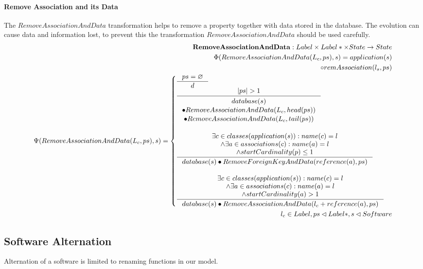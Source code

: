 \documentclass[11pt]{article}
\begin{document}
\paragraph{Remove Association and its Data} The $RemoveAssociationAndData$ transformation helps to remove a property together with data stored in the database. The evolution can cause data and information lost, to prevent this the transformation $RemoveAssociationAndData $ should be used carefully.
\begin{align*}
	\mathbf{RemoveAssociationAndData} : Label \times Label* \times State \rightarrow State \\
	\Phi(RemoveAssociationAndData(L_c, ps), s) = application(s)\\ \circ remAssociation(l_s, ps) \\
	\Psi(RemoveAssociationAndData(L_c, ps), s) = \begin{cases}
		\inference{ps = \varnothing}{d}\\
		\inference{|ps| > 1}{\begin{gathered}
			database(s) \\ \bullet RemoveAssociationAndData(L_c, head(ps)) \\ \bullet RemoveAssociationAndData(L_c, tail(ps))
	\end{gathered}}\\\\
 		\inference{\exists c \in classes(application(s)) : name(c) = l\\ 	\wedge \exists a \in associations(c) : name(a) = l \\ \wedge startCardinality(p) \leq 1}{database(s) \bullet RemoveForeignKeyAndData(reference(a), ps)}\\\\
 	\inference{\exists c \in classes(application(s)) : name(c) = l\\ 	\wedge \exists a \in associations(c) : name(a) = l \\ \wedge startCardinality(a) > 1}{database(s) \bullet RemoveAssociationAndData(l_c + reference(a), ps)}
 \end{cases}
	\\
	l_c \in Label, ps \lhd Label*, s \lhd Software
\end{align*}


\subsection{Software Alternation}
Alternation of a software is limited to renaming functions in our model.
\end{document}
